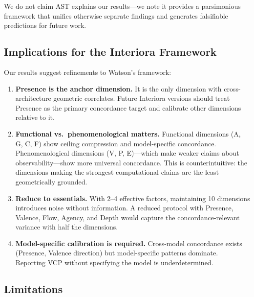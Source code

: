 \documentclass[11pt,a4paper]{article}
\begin{document}
We do not claim AST explains our results---we note it provides a parsimonious framework that unifies otherwise separate findings and generates falsifiable predictions for future work.

\subsection{Implications for the Interiora Framework}

Our results suggest refinements to Watson's framework:

\begin{enumerate}
    \item \textbf{Presence is the anchor dimension.} It is the only dimension with cross-architecture geometric correlates. Future Interiora versions should treat Presence as the primary concordance target and calibrate other dimensions relative to it.

    \item \textbf{Functional vs.\ phenomenological matters.} Functional dimensions (A, G, C, F) show ceiling compression and model-specific concordance. Phenomenological dimensions (V, P, E)---which make weaker claims about observability---show more universal concordance. This is counterintuitive: the dimensions making the strongest computational claims are the least geometrically grounded.

    \item \textbf{Reduce to essentials.} With 2--4 effective factors, maintaining 10 dimensions introduces noise without information. A reduced protocol with Presence, Valence, Flow, Agency, and Depth would capture the concordance-relevant variance with half the dimensions.

    \item \textbf{Model-specific calibration is required.} Cross-model concordance exists (Presence, Valence direction) but model-specific patterns dominate. Reporting VCP without specifying the model is underdetermined.
\end{enumerate}

\subsection{Limitations}
\end{document}
